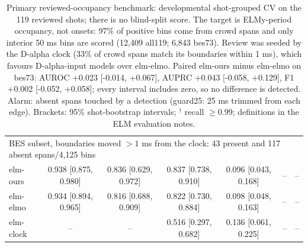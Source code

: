 \begin{table}[t]
\begin{tabular}{lcccccc}
\midrule
\multicolumn{7}{l}{BES subset, boundaries moved $>1$ ms from the clock: 43 present and 117 absent spans/4,125 bins} \\
elm-ours & 0.938 {\scriptsize[0.875, 0.980]} & 0.836 {\scriptsize[0.629, 0.972]} & 0.837 {\scriptsize[0.738, 0.910]} & 0.096 {\scriptsize[0.043, 0.168]} & -- & -- \\
elm-elmo & 0.934 {\scriptsize[0.894, 0.965]} & 0.816 {\scriptsize[0.688, 0.909]} & 0.822 {\scriptsize[0.730, 0.884]} & 0.098 {\scriptsize[0.048, 0.163]} & -- & -- \\
elm-clock & -- & -- & 0.516 {\scriptsize[0.297, 0.682]} & 0.136 {\scriptsize[0.061, 0.225]} & -- & -- \\
\bottomrule
\end{tabular}\caption{Primary reviewed-occupancy benchmark: developmental shot-grouped CV on the 119 reviewed shots; there is no blind-split score. The target is ELMy-period occupancy, not onsets: 97\% of positive bins come from crowd spans and only interior 50 ms bins are scored (12,409 all119; 6,843 bes73). Review was seeded by the D-alpha clock (33\% of crowd spans match its boundaries within 1 ms), which favours D-alpha-input models over elm-elmo. Paired elm-ours minus elm-elmo on bes73: AUROC +0.023 [-0.014, +0.067], AUPRC +0.043 [-0.058, +0.129], F1 +0.002 [-0.052, +0.058]; every interval includes zero, so no difference is detected. Alarm: absent spans touched by a detection (guard25: 25 ms trimmed from each edge). Brackets: 95\% shot-bootstrap intervals; $^{\dagger}$ recall $\geq0.99$; definitions in the ELM evaluation notes.}
\label{tab:elm-benchmark}
\end{table}
